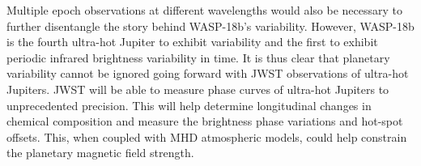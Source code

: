 Multiple epoch observations at different wavelengths would also be necessary to further disentangle the story behind WASP-18b's variability. However, WASP-18b is the fourth ultra-hot Jupiter to exhibit variability and the first to exhibit periodic infrared brightness variability in time. It is thus clear that planetary variability cannot be ignored going forward with JWST observations of ultra-hot Jupiters. JWST will be able to measure phase curves of ultra-hot Jupiters to unprecedented precision. This will help determine longitudinal changes in chemical composition and measure the brightness phase variations and hot-spot offsets. This, when coupled with MHD atmospheric models, could help constrain the planetary magnetic field strength.






% 
% 

